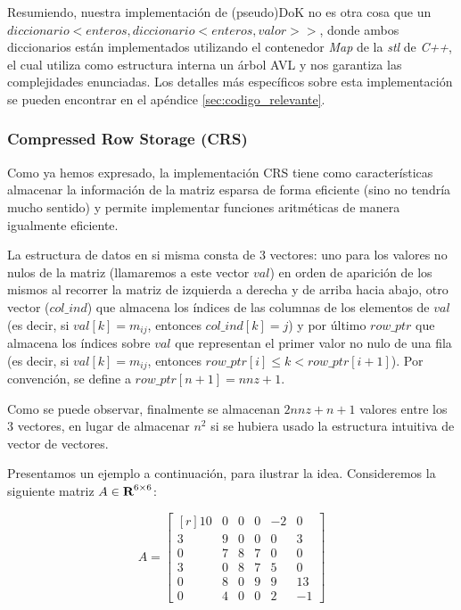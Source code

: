 \par Resumiendo, nuestra implementaci\'on de (pseudo)DoK no es otra cosa que un
$diccionario< enteros,diccionario<enteros,valor>>$, donde ambos diccionarios
est\'an implementados utilizando el contenedor \emph{Map} de la \emph{stl} de
\emph{C++}, el cual utiliza como estructura interna un \'arbol AVL y nos
garantiza las complejidades enunciadas\cite{stl_map}. Los detalles m\'as
espec\'ificos sobre esta implementaci\'on se pueden encontrar en el ap\'endice
\ref{sec:codigo_relevante}.

\subsubsection*{Compressed Row Storage (CRS)}
\par Como ya hemos expresado, la implementaci\'on CRS tiene como
caracter\'isticas almacenar la informaci\'on de la matriz esparsa de forma
eficiente (sino no tendr\'ia mucho sentido) y permite implementar funciones
aritm\'eticas de manera igualmente eficiente.

\par La estructura de datos en si misma consta de 3 vectores: uno para los
valores no nulos de la matriz (llamaremos a este vector $val$) en orden de
aparici\'on de los mismos al recorrer la matriz de izquierda a derecha y de
arriba hacia abajo, otro vector ($col\_ind$) que almacena los \'indices de las
columnas de los elementos de $val$ (es decir, si $val[k] = m_{ij}$, entonces
$col\_ind[k] = j$) y por \'ultimo $row\_ptr$ que almacena los \'indices sobre
$val$ que representan el primer valor no nulo de una fila (es decir, si $val[k]
= m_{ij}$, entonces $row\_ptr[i]\leq k < row\_ptr[i+1]$). Por convenci\'on, se
define a $row\_ptr[n+1] = nnz+1$\cite{netlib_crs}.

\par Como se puede observar, finalmente se almacenan $2nnz+n+1$ valores entre
los 3 vectores, en lugar de almacenar $n^2$ si se hubiera usado la estructura
intuitiva de vector de vectores.

\par Presentamos un ejemplo a continuaci\'on, para ilustrar la idea.
Consideremos la siguiente matriz $A\in\hbox{\bf R}^{6\times 6}$\cite{netlib_crs}:

\begin{equation*}
    A = \begin{bmatrix*}[r]
        10 &0 &0 &0 &-2 &0\\[-0.65em]
         3 &9 &0 &0 &0  &3\\[-0.65em]
         0 &7 &8 &7 &0  &0\\[-0.65em]
         3 &0 &8 &7 &5  &0\\[-0.65em]
         0 &8 &0 &9 &9  &13\\[-0.65em]
         0 &4 &0 &0 &2  &-1
    \end{bmatrix*}
\end{equation*}

